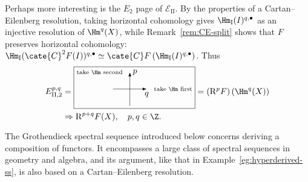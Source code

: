 \begin{example}
	Perhaps more interesting is the $E_2$ page of
	$\mathscr{E}_{\mathrm{II}}$. By the properties of a Cartan--Eilenberg
	resolution, taking horizontal cohomology gives
	$\Hm_{\mathrm{I}}(I)^{q,\bullet}$ as an injective resolution of
	$\Hm^q(X)$, while Remark~\ref{rem:CE-split} shows that $F$ preserves
	horizontal cohomology:
	$\Hm_{\mathrm{I}}(\cate{C}^2F(I))^{q,\bullet}
	\simeq\cate{C}F\left(\Hm_{\mathrm{I}}(I)^{q,\bullet}\right)$. Thus
	\begin{align*}
		E_{\mathrm{II},2}^{p, q} & =
		\begin{tikzpicture}[scale=0.7, baseline=(O)]
			\draw[-Latex] (0, -1) -- (0, 1) node[right] {$p$} node[left=0.5em] {\scriptsize\text{take $\Hm$ second}};
			\draw[-Latex] (-1, 0) -- (1, 0) node[below] {$q$} node[right=0.5em] {\scriptsize\text{take $\Hm$ first}};
			\coordinate (O) at (0, -0.3);
			\draw (current bounding box.north west) rectangle ([yshift=-1ex] current bounding box.south east);
		\end{tikzpicture}
		= (\mathrm{R}^p F)\left( \Hm^q(X)\right) \\
		& \Rightarrow \mathrm{R}^{p+q}F(X) , \quad p, q \in \Z.
	\end{align*}
\end{example}

The Grothendieck spectral sequence introduced below concerns deriving a
composition of functors. It encompasses a large class of spectral sequences
in geometry and algebra, and its argument, like that in
Example~\ref{eg:hyperderived-ss}, is also based on a Cartan--Eilenberg
resolution.


